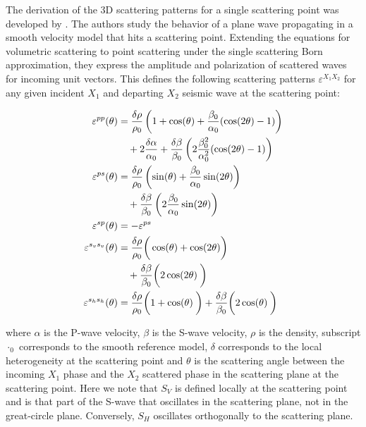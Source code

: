 \documentclass[10pt,a4paper]{article}
\numberwithin{equation}{section}
\DeclareRobustCommand{\rq}[1]{{\sethlcolor{myblue}\hl{#1}}}
\begin{document}
The derivation of the 3D scattering patterns for a single scattering point was developed by \cite{beyl_wamo_90}.
The authors study the behavior of a plane wave propagating in a smooth velocity model that hits a scattering point.
Extending the equations for volumetric scattering to point scattering under the single scattering Born approximation, they express the amplitude and polarization of scattered waves for incoming unit vectors.
This defines the following scattering patterns $\varepsilon^{X_1X_2}$ for any given incident $X_1$ and departing $X_2$ seismic wave at the scattering point:

\begin{align}
  \varepsilon^{pp} (\theta) &= \dfrac{\delta \rho}{\rho_0} 
                               \left( 1 + \cos(\theta) + \dfrac{\beta_0}{\alpha_0} (\cos(2\theta)-1) \right) \notag
                   \\ & \quad + 2 \dfrac{\delta \alpha}{\alpha_0} 
                               + \dfrac{\delta \beta}{\beta_0} \left( 2 \dfrac{\beta_0^2}{\alpha_0^2} (\cos(2\theta)-1) \right)
\\
  \varepsilon^{ps} (\theta) &= \dfrac{\delta \rho}{\rho_0} 
                               \left( \sin(\theta) + \dfrac{\beta_0}{\alpha_0} \sin(2\theta) \right) \notag
                   \\ & \quad + \dfrac{\delta \beta}{\beta_0} \left( 2 \dfrac{\beta_0}{\alpha_0} \sin(2\theta) \right)
\\
  \varepsilon^{sp} (\theta) &= - \varepsilon^{ps}
\\
  \varepsilon^{s_vs_v} (\theta) &= \dfrac{\delta \rho}{\rho_0} 
                                   \bigg( \cos(\theta) + \cos(2\theta) \bigg) \notag
                       \\ & \quad + \dfrac{\delta \beta}{\beta_0} \bigg( 2 \cos(2\theta) \dfrac{}{} \bigg) 
\\
  \varepsilon^{s_hs_h} (\theta) &= \dfrac{\delta \rho}{\rho_0} 
                                   \bigg( 1 + \cos(\theta) \dfrac{}{} \bigg)
                                   + \dfrac{\delta \beta}{\beta_0} \bigg( 2 \cos(\theta) \dfrac{}{} \bigg)
\end{align}
\vspace{1mm}

\noindent where $\alpha$ is the P-wave velocity, 
$\beta$ is the S-wave velocity, 
$\rho$ is the density, 
subscript $\cdot_0$ corresponds to the smooth reference model, 
$\delta$ corresponds to the local heterogeneity at the scattering point and 
$\theta$ is the scattering angle between the incoming $X_1$ phase and the $X_2$ scattered phase in the scattering plane at the scattering point.
Here we note that $S_V$ is defined locally at the scattering point and is that part of the S-wave that oscillates in the scattering plane, not in the great-circle plane.
Conversely, $S_H$ oscillates orthogonally to the scattering plane.
\end{document}

